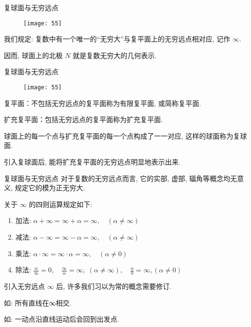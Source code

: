 \documentclass{beamer}
\begin{document}
\begin{frame}{复球面与无穷远点}
\begin{figure}
    \texttt{[image: 55]}
\end{figure}

我们规定: 复数中有一个唯一的``无穷大''与复平面上的无穷远点相对应, 记作 $ \infty $. 

\bigskip

因而,   球面上的北极 $ N $ 就是复数无穷大的几何表示.

\end{frame}

\begin{frame}{复球面与无穷远点}
\begin{figure}
    \texttt{[image: 55]}
\end{figure}
\begin{alertblock}{复平面：不包括无穷远点的复平面称为有限复平面, 或简称复平面.}
\end{alertblock}
\bigskip
\begin{alertblock}{扩充复平面：包括无穷远点的复平面称为扩充复平面.}


\bigskip

球面上的每一个点与扩充复平面的每一个点构成了一一对应, 这样的球面称为复球面.

\bigskip

引入复球面后, 能将扩充复平面的无穷远点明显地表示出来.
\end{alertblock}

\end{frame}

\begin{frame}{复球面与无穷远点}
对于复数的无穷远点而言, 它的实部, 虚部,  辐角等概念均无意义, 规定它的模为正无穷大.

关于 $ \infty $ 的四则运算规定如下: 

\begin{enumerate}[(1)]
    \item 加法:  $ \alpha + \infty = \infty + \alpha = \infty, \quad (\alpha \ne \infty ) $ 
    \item 减法:  $ \alpha - \infty = \infty - \alpha = \infty, \quad (\alpha \ne \infty ) $ 
    \item 乘法:  $ \alpha \cdot \infty = \infty \cdot \alpha = \infty, \quad (\alpha \ne 0) $ 
    \item 除法:  $ \frac{\alpha }{\infty } = 0, \quad \frac{\infty }{\alpha } = \infty, \; (\alpha \ne \infty ), \quad \frac{\alpha }{0} = \infty, (\alpha \ne 0) $ 
\end{enumerate}

引入无穷远点 $ \infty $ 后, 许多我们习以为常的概念需要修订. 

如: 所有直线在∞相交. 

如: 一动点沿直线运动后会回到出发点. 

\end{frame}
\end{document}
